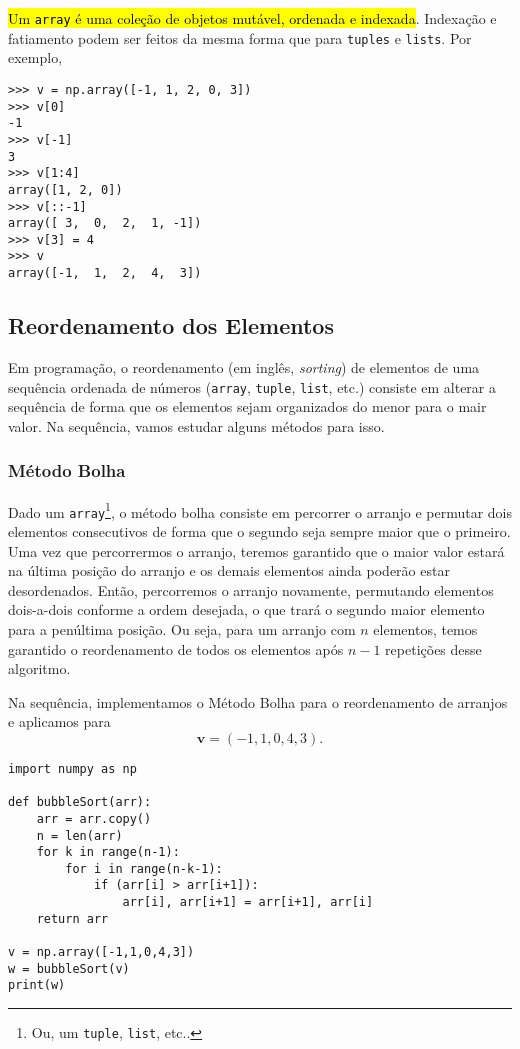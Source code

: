 \hl{Um {\lstinline+array+} é uma coleção de objetos mutável, ordenada e indexada}. Indexação e fatiamento podem ser feitos da mesma forma que para \lstinline+tuples+ e \lstinline+lists+. Por exemplo,
\begin{lstlisting}
>>> v = np.array([-1, 1, 2, 0, 3])
>>> v[0]
-1
>>> v[-1]
3
>>> v[1:4]
array([1, 2, 0])
>>> v[::-1]
array([ 3,  0,  2,  1, -1])
>>> v[3] = 4
>>> v
array([-1,  1,  2,  4,  3])
\end{lstlisting}

\subsection{Reordenamento dos Elementos}

Em programação, o reordenamento (em inglês, \textit{sorting}) de elementos de uma sequência ordenada de números (\lstinline+array+, \lstinline+tuple+, \lstinline+list+, etc.) consiste em alterar a sequência de forma que os elementos sejam organizados do menor para o mair valor. Na sequência, vamos estudar alguns métodos para isso.

\subsubsection{Método Bolha}

Dado um \lstinline+array+\footnote{Ou, um \lstinline+tuple+, \lstinline+list+, etc..}, o método bolha consiste em percorrer o arranjo e permutar dois elementos consecutivos de forma que o segundo seja sempre maior que o primeiro. Uma vez que percorrermos o arranjo, teremos garantido que o maior valor estará na última posição do arranjo e os demais elementos ainda poderão estar desordenados. Então, percorremos o arranjo novamente, permutando elementos dois-a-dois conforme a ordem desejada, o que trará o segundo maior elemento para a penúltima posição. Ou seja, para um arranjo com $n$ elementos, temos garantido o reordenamento de todos os elementos após $n-1$ repetições desse algoritmo.

\begin{ex}
  Na sequência, implementamos o Método Bolha para o reordenamento de arranjos e aplicamos para
  \begin{equation}
    \pmb{v} = (-1, 1, 0, 4, 3).
  \end{equation}
  
\begin{lstlisting}[caption=bubbleSort\_v1.py]
import numpy as np

def bubbleSort(arr):
    arr = arr.copy()
    n = len(arr)
    for k in range(n-1):
        for i in range(n-k-1):
            if (arr[i] > arr[i+1]):
                arr[i], arr[i+1] = arr[i+1], arr[i]
    return arr

v = np.array([-1,1,0,4,3])
w = bubbleSort(v)
print(w)
\end{lstlisting}
\end{ex}

